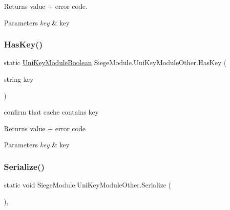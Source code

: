 \begin{DoxyReturn}{Returns}
value + error code.
\end{DoxyReturn}

\begin{DoxyParams}{Parameters}
{\em key} & key\\
\hline
\end{DoxyParams}
\mbox{\label{class_siege_module_1_1_uni_key_module_other_adb8428817e6364d8cf1417c8806f9b80}} 
\subsubsection{\texorpdfstring{Has\+Key()}{HasKey()}}
{\footnotesize\ttfamily static \mbox{\hyperlink{struct_siege_module_1_1_uni_key_module_boolean}{Uni\+Key\+Module\+Boolean}} Siege\+Module.\+Uni\+Key\+Module\+Other.\+Has\+Key (\begin{DoxyParamCaption}\item[{string}]{key }\end{DoxyParamCaption})\hspace{0.3cm}{\ttfamily [static]}}



confirm that cache contains key 

\begin{DoxyReturn}{Returns}
value + error code
\end{DoxyReturn}

\begin{DoxyParams}{Parameters}
{\em key} & key\\
\hline
\end{DoxyParams}
\mbox{\label{class_siege_module_1_1_uni_key_module_other_a9edb18f38f81b27348138c8cd13ead32}} 
\subsubsection{\texorpdfstring{Serialize()}{Serialize()}}
{\footnotesize\ttfamily static void Siege\+Module.\+Uni\+Key\+Module\+Other.\+Serialize (\begin{DoxyParamCaption}{ }\end{DoxyParamCaption})\hspace{0.3cm}{\ttfamily [static]}, {\ttfamily [private]}}



